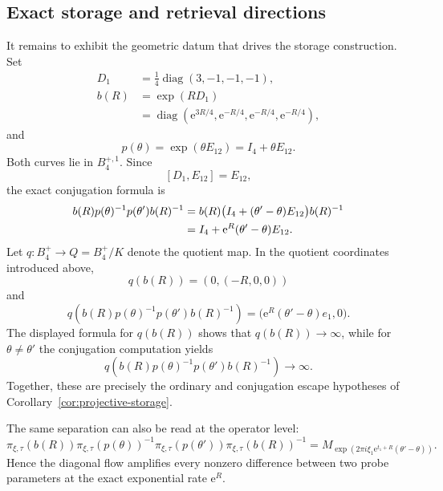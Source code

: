 \documentclass[10pt,a4paper]{amsart}
\numberwithin{equation}{section}
\newcommand{\e}{\mathrm e}
\begin{document}
\subsection{Exact storage and retrieval directions}

It remains to exhibit the geometric datum that drives the storage
construction.  Set
\[
 \begin{aligned}
 D_1&=\frac14\operatorname{diag}(3,-1,-1,-1),\\
 b(R)&=\exp(RD_1)\\
 &=\operatorname{diag}
 \left(\e^{3R/4},\e^{-R/4},\e^{-R/4},\e^{-R/4}\right),
 \end{aligned}
\]
and
\[
 p(\theta)=\exp(\theta E_{12})=I_4+\theta E_{12}.
\]
Both curves lie in $B_4^{+,1}$.  Since
\[
 [D_1,E_{12}]=E_{12},
\]
the exact conjugation formula is
\begin{align}
 b(R)p(\theta)^{-1}p(\theta')b(R)^{-1}
 &=b(R)\bigl(I_4+(\theta'-\theta)E_{12}\bigr)b(R)^{-1}\notag\\
 &=I_4+\e^R(\theta'-\theta)E_{12}.
 \label{eq:B4-exact-escape}
\end{align}
Let $q:B_4^+\to Q=B_4^+/K$ denote the quotient map.  In the quotient
coordinates introduced above,
\[
 q(b(R))=(0,(-R,0,0))
\]
and
\[
 q\!\left(
 b(R)p(\theta)^{-1}p(\theta')b(R)^{-1}
 \right)
 =\bigl(\e^R(\theta'-\theta)e_1,0\bigr).
\]
The displayed formula for $q(b(R))$ shows that $q(b(R))\to\infty$, while
for $\theta\neq\theta'$ the conjugation computation yields
\[
 q\!\left(
 b(R)p(\theta)^{-1}p(\theta')b(R)^{-1}
 \right)\longrightarrow\infty.
\]
Together, these are precisely the ordinary and conjugation escape hypotheses
of Corollary~\ref{cor:projective-storage}.

The same separation can also be read at the operator level:
\[
 \pi_{\xi,\tau}(b(R))
 \pi_{\xi,\tau}(p(\theta))^{-1}
 \pi_{\xi,\tau}(p(\theta'))
 \pi_{\xi,\tau}(b(R))^{-1}
 =M_{\exp(2\pi i\xi_1\e^{t_1+R}(\theta'-\theta))}.
\]
Hence the diagonal flow amplifies every nonzero difference between two probe
parameters at the exact exponential rate $\e^R$.
\end{document}
